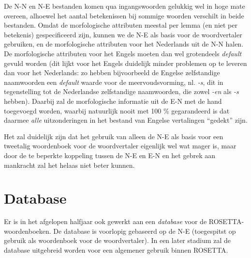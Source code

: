 De N-N en N-E bestanden komen qua ingangswoorden gelukkig wel in hoge mate 
overeen, alhoewel het aantal betekenissen bij sommige woorden verschilt in 
beide bestanden. Omdat de morfologische attributen meestal per lemma (en
niet per betekenis) gespecificeerd zijn, kunnen 
we de N-E als basis voor de woordvertaler gebruiken, en
de morfologische attributen voor het Nederlands uit de N-N halen.
De morfologische attributen voor het Engels moeten dan wel grotendeels {\em 
default} gevuld worden (dit lijkt voor het Engels duidelijk minder problemen 
op te leveren dan voor het Nederlands: zo hebben bijvoorbeeld de Engelse 
zelfstandige naamwoorden een {\em default} waarde voor de meervoudsvorming, 
nl. {\em \mbox{-s}}, dit in tegenstelling tot de Nederlandse 
zelfstandige naamwoorden, die zowel {\em \mbox{-en}} als {\em \mbox{-s}}
hebben). 
Daarbij zal de morfologische informatie uit de E-N met de hand toegevoegd
worden, waarbij natuurlijk nooit met 100 \% gegarandeerd is dat daarmee 
{\em alle} uitzonderingen in het bestand van Engelse vertalingen ``gedekt''
zijn. 

Het zal duidelijk zijn dat het gebruik van alleen de N-E als basis voor een 
tweetalig woordenboek voor de woordvertaler
eigenlijk wel wat mager is, maar door de te beperkte 
koppeling tussen de N-E en E-N en het gebrek aan mankracht
zal het helaas niet beter kunnen.

\section{Database}

Er is in het afgelopen halfjaar ook gewerkt aan een {\em database} voor
de ROSETTA-woordenboeken.
De database is voorlopig gebaseerd op de N-E (toegespitst op gebruik als 
woordenboek voor de woordvertaler). In een later stadium zal de database 
uitgebreid worden voor een algemener gebruik binnen ROSETTA.



